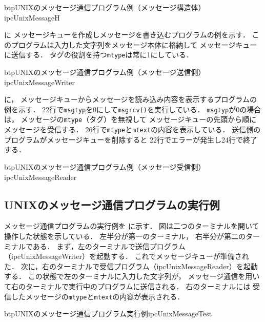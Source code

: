 \begin{myfig}{btp}{UNIXのメッセージ通信プログラム例（メッセージ構造体）}
{ipcUnixMessageH}

\end{myfig}

に
メッセージキューを作成しメッセージを書き込むプログラムの例を示す．
このプログラムは入力した文字列をメッセージ本体に格納して
メッセージキューに送信する．
タグの役割を持つ{\tt mtype}は常に1にしている．

\begin{myfig}{btp}{UNIXのメッセージ通信プログラム例（メッセージ送信側）}
{ipcUnixMessageWriter}

\end{myfig}

に，
メッセージキューからメッセージを読み込み内容を表示するプログラムの例を示す．
22行で{\tt msgtyp}を0にして{\tt msgrcv()}を実行している．
{\tt msgtyp}が0の場合は，
メッセージの{\tt mtype}（タグ）を無視して
メッセージキューの先頭から順にメッセージを受信する．
26行で{\tt mtype}と{\tt mtext}の内容を表示している．
送信側のプログラムがメッセージキューを削除すると
22行でエラーが発生し24行で終了する．

\begin{myfig}{btp}{UNIXのメッセージ通信プログラム例（メッセージ受信側）}
{ipcUnixMessageReader}

\end{myfig}

\subsection{UNIXのメッセージ通信プログラムの実行例}
メッセージ通信プログラムの実行例を
に示す．
図は二つのターミナルを開いて操作した状態を示している．
左半分が第一のターミナル，
右半分が第二のターミナルである．
まず，左のターミナルで送信プログラム（ipcUnixMessageWriter）を起動する．
これでメッセージキューが準備された．
次に，右のターミナルで受信プログラム（ipcUnixMessageReader）を起動する．
この状態で左のターミナルに入力した文字列が，
メッセージ通信を用いて右のターミナルで実行中のプログラムに送信される．
右のターミナルには
受信したメッセージの{\tt mtype}と{\tt mtext}の内容が表示される．

\begin{myfig}{btp}{UNIXのメッセージ通信プログラム実行例}{ipcUnixMessageTest}

\end{myfig}

